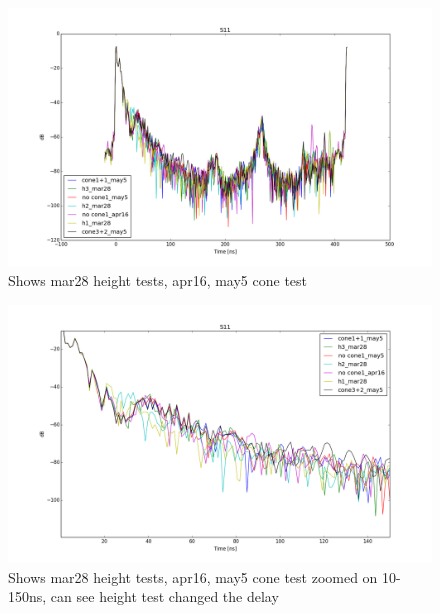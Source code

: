 \documentclass[preprint]{aastex}  %
\begin{document}
\begin{figure}[H]
	\begin{center}
	\includegraphics[width =\textwidth]{./reflectometry_plots/configcompare}
	\caption{Shows mar28 height tests, apr16, may5 cone test
\label{Fig:} }
	\end{center}
\end{figure}
\begin{figure}[H]
	\begin{center}
	\includegraphics[width =\textwidth]{./reflectometry_plots/configcompare10-150ns}
	\caption{Shows mar28 height tests, apr16, may5 cone test zoomed on 10-150ns, can see height test changed the delay
\label{Fig:} }
	\end{center}
\end{figure}
\end{document}

